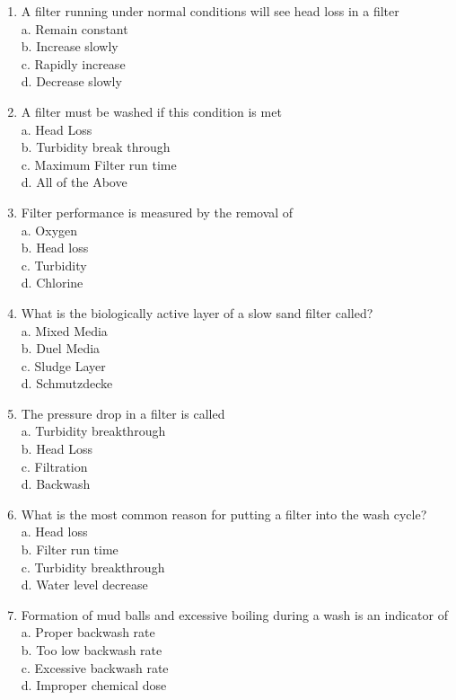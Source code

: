 \begin{enumerate}
\item A filter running under normal conditions will see head loss in a filter \\
a. Remain constant \\
b. Increase slowly \\
c. Rapidly increase \\
d. Decrease slowly \\

\item A filter must be washed if this condition is met \\
a. Head Loss \\
b. Turbidity break through \\
c. Maximum Filter run time \\
d. All of the Above \\

\item Filter performance is measured by the removal of \\
a. Oxygen \\
b. Head loss \\
c. Turbidity \\
d. Chlorine \\

\item What is the biologically active layer of a slow sand filter called? \\
a. Mixed Media \\
b. Duel Media \\
c. Sludge Layer \\
d. Schmutzdecke \\

\item The pressure drop in a filter is called \\
a. Turbidity breakthrough \\
b. Head Loss \\
c. Filtration \\
d. Backwash \\

\item What is the most common reason for putting a filter into the wash cycle? \\
a. Head loss \\
b. Filter run time \\
c. Turbidity breakthrough \\
d. Water level decrease \\

\item Formation of mud balls and excessive boiling during a wash is an indicator of \\
a. Proper backwash rate \\
b. Too low backwash rate \\
c. Excessive backwash rate \\
d. Improper chemical dose \\


\end{enumerate}
